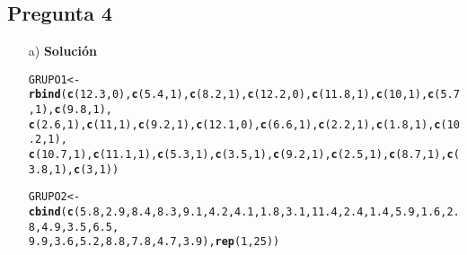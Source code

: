 \documentclass[10pt]{article}\usepackage[]{graphicx}\usepackage[]{color}
\makeatletter
\newcommand{\hlnum}[1]{\textcolor[rgb]{0.686,0.059,0.569}{#1}}%
\newcommand{\hlstd}[1]{\textcolor[rgb]{0.345,0.345,0.345}{#1}}%
\newcommand{\hlkwb}[1]{\textcolor[rgb]{0.69,0.353,0.396}{#1}}%
\newcommand{\hlkwd}[1]{\textcolor[rgb]{0.737,0.353,0.396}{\textbf{#1}}}%
\newenvironment{kframe}{%
 \def\at@end@of@kframe{}%
 \ifinner\ifhmode%
  \def\at@end@of@kframe{\end{minipage}}%
  \begin{minipage}{\columnwidth}%
 \fi\fi%
 \def\FrameCommand##1{\hskip\@totalleftmargin \hskip-\fboxsep
 \colorbox{shadecolor}{##1}\hskip-\fboxsep
     \hskip-\linewidth \hskip-\@totalleftmargin \hskip\columnwidth}%
 \MakeFramed {\advance\hsize-\width
   \@totalleftmargin\z@ \linewidth\hsize
   \@setminipage}}%
 {\par\unskip\endMakeFramed%
 \at@end@of@kframe}
\newenvironment{knitrout}{}{} %
\makeatother
\begin{document}
{\subsection*{Pregunta 4} 

\begin{itemize} 

\item[a)] \textbf{Solución}\\


\begin{knitrout}
\color{fgcolor}\begin{kframe}
\begin{alltt}
\hlstd{GRUPO1}\hlkwb{<-}\hlkwd{rbind}\hlstd{(}\hlkwd{c}\hlstd{(}\hlnum{12.3}\hlstd{,}\hlnum{0}\hlstd{),}\hlkwd{c}\hlstd{(}\hlnum{5.4}\hlstd{,}\hlnum{1}\hlstd{),}\hlkwd{c}\hlstd{(}\hlnum{8.2}\hlstd{,}\hlnum{1}\hlstd{),}\hlkwd{c}\hlstd{(}\hlnum{12.2}\hlstd{,}\hlnum{0}\hlstd{),}\hlkwd{c}\hlstd{(}\hlnum{11.8}\hlstd{,}\hlnum{1}\hlstd{),}\hlkwd{c}\hlstd{(}\hlnum{10}\hlstd{,}\hlnum{1}\hlstd{),}\hlkwd{c}\hlstd{(}\hlnum{5.7}\hlstd{,}\hlnum{1}\hlstd{),}\hlkwd{c}\hlstd{(}\hlnum{9.8}\hlstd{,}\hlnum{1}\hlstd{),}
              \hlkwd{c}\hlstd{(}\hlnum{2.6}\hlstd{,}\hlnum{1}\hlstd{),}\hlkwd{c}\hlstd{(}\hlnum{11}\hlstd{,}\hlnum{1}\hlstd{),}\hlkwd{c}\hlstd{(}\hlnum{9.2}\hlstd{,}\hlnum{1}\hlstd{),}\hlkwd{c}\hlstd{(}\hlnum{12.1}\hlstd{,}\hlnum{0}\hlstd{),}\hlkwd{c}\hlstd{(}\hlnum{6.6}\hlstd{,}\hlnum{1}\hlstd{),}\hlkwd{c}\hlstd{(}\hlnum{2.2}\hlstd{,}\hlnum{1}\hlstd{),}\hlkwd{c}\hlstd{(}\hlnum{1.8}\hlstd{,}\hlnum{1}\hlstd{),}\hlkwd{c}\hlstd{(}\hlnum{10.2}\hlstd{,}\hlnum{1}\hlstd{),}
              \hlkwd{c}\hlstd{(}\hlnum{10.7}\hlstd{,}\hlnum{1}\hlstd{),}\hlkwd{c}\hlstd{(}\hlnum{11.1}\hlstd{,}\hlnum{1}\hlstd{),}\hlkwd{c}\hlstd{(}\hlnum{5.3}\hlstd{,}\hlnum{1}\hlstd{),}\hlkwd{c}\hlstd{(}\hlnum{3.5}\hlstd{,}\hlnum{1}\hlstd{),}\hlkwd{c}\hlstd{(}\hlnum{9.2}\hlstd{,}\hlnum{1}\hlstd{),}\hlkwd{c}\hlstd{(}\hlnum{2.5}\hlstd{,}\hlnum{1}\hlstd{),}\hlkwd{c}\hlstd{(}\hlnum{8.7}\hlstd{,}\hlnum{1}\hlstd{),}\hlkwd{c}\hlstd{(}\hlnum{3.8}\hlstd{,}\hlnum{1}\hlstd{),}\hlkwd{c}\hlstd{(}\hlnum{3}\hlstd{,}\hlnum{1}\hlstd{))}

\hlstd{GRUPO2}\hlkwb{<-}\hlkwd{cbind}\hlstd{(}\hlkwd{c}\hlstd{(}\hlnum{5.8}\hlstd{,}\hlnum{2.9}\hlstd{,}\hlnum{8.4}\hlstd{,}\hlnum{8.3}\hlstd{,}\hlnum{9.1}\hlstd{,}\hlnum{4.2}\hlstd{,}\hlnum{4.1}\hlstd{,}\hlnum{1.8}\hlstd{,}\hlnum{3.1}\hlstd{,}\hlnum{11.4}\hlstd{,}\hlnum{2.4}\hlstd{,}\hlnum{1.4}\hlstd{,}\hlnum{5.9}\hlstd{,}\hlnum{1.6}\hlstd{,}\hlnum{2.8}\hlstd{,}\hlnum{4.9}\hlstd{,}\hlnum{3.5}\hlstd{,}\hlnum{6.5}\hlstd{,}
                \hlnum{9.9}\hlstd{,}\hlnum{3.6}\hlstd{,}\hlnum{5.2}\hlstd{,}\hlnum{8.8}\hlstd{,}\hlnum{7.8}\hlstd{,}\hlnum{4.7}\hlstd{,}\hlnum{3.9}\hlstd{),}\hlkwd{rep}\hlstd{(}\hlnum{1}\hlstd{,}\hlnum{25}\hlstd{))}


\end{alltt}
\end{kframe}
\end{knitrout}
\end{itemize}}
\end{document}
